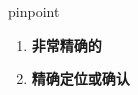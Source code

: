 
\begin{frame}
{\huge pinpoint}
\begin{center}
\begin{enumerate}\Large
  \item \textbf{非常精确的}
  \item \textbf{精确定位或确认}
\end{enumerate}
\end{center}
\end{frame}
